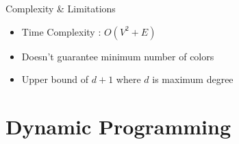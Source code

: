 \documentclass[12pt]{beamer}
\begin{document}
	\begin{frame}{Complexity \& Limitations}
		\begin{itemize}
			\item Time Complexity : $O(V^2 + E)$\pause \vspace{10pt}
			\item Doesn't guarantee minimum number of colors\pause \vspace{10pt}
			\item Upper bound of $d+1$ where $d$ is maximum degree
		\end{itemize}
	\end{frame}
	
	\section{Dynamic Programming}
	
\end{document}
